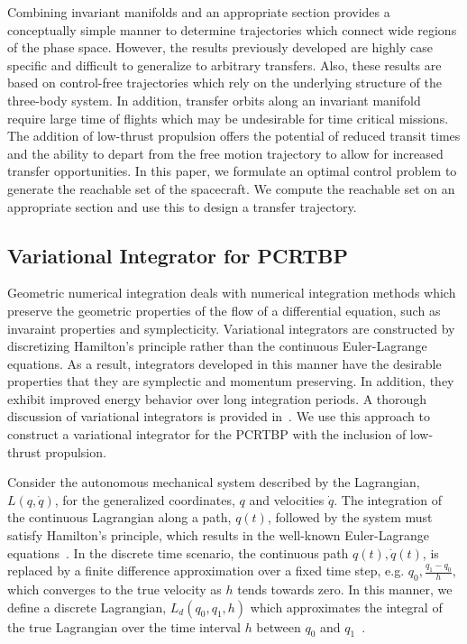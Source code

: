 \documentclass[smallcondensed]{svjour3}
\begin{document}
Combining invariant manifolds and an appropriate \Poincare section provides a conceptually simple manner to determine trajectories which connect wide regions of the phase space.
However, the results previously developed are highly case specific and difficult to generalize to arbitrary transfers.
Also, these results are based on control-free trajectories which rely on the underlying structure of the three-body system.
In addition, transfer orbits along an invariant manifold require large time of flights which may be undesirable for time critical missions.
The addition of low-thrust propulsion offers the potential of reduced transit times and the ability to depart from the free motion trajectory to allow for increased transfer opportunities. 
In this paper, we formulate an optimal control problem to generate the reachable set of the spacecraft.
We compute the reachable set on an appropriate \Poincare section and use this to design a transfer trajectory.

\subsection{Variational Integrator for PCRTBP}\label{sec:discrete_var}
Geometric numerical integration deals with numerical integration methods which preserve the geometric properties of the flow of a differential equation, such as invaraint properties and symplecticity.
Variational integrators are constructed by discretizing Hamilton's principle rather than the continuous Euler-Lagrange equations.
As a result, integrators developed in this manner have the desirable properties that they are symplectic and momentum preserving.
In addition, they exhibit improved energy behavior over long integration periods.
A thorough discussion of variational integrators is provided in~\cite{west2004,marsden2001}.
We use this approach to construct a variational integrator for the PCRTBP with the inclusion of low-thrust propulsion.

Consider the autonomous mechanical system described by the Lagrangian, \( L(q, \dot{q} ) \), for the generalized coordinates, \( q\) and velocities \( \dot{q} \).
The integration of the continuous Lagrangian along a path, \( q (t) \), followed by the system must satisfy Hamilton's principle, which results in the well-known Euler-Lagrange equations~\cite{lanczos1970}.
In the discrete time scenario, the continuous path \( q(t), \dot{q}(t) \), is replaced by a finite difference approximation over a fixed time step, e.g. \( q_0, \frac{q_1 - q_0}{h} \), which converges to the true velocity as \( h \) tends towards zero.
In this manner, we define a discrete Lagrangian, \( L_d (q_0, q_1, h) \) which approximates the integral of the true Lagrangian over the time interval \( h \) between \( q_0 \) and \( q_1\)~\cite{marsden2001}.
\end{document}
